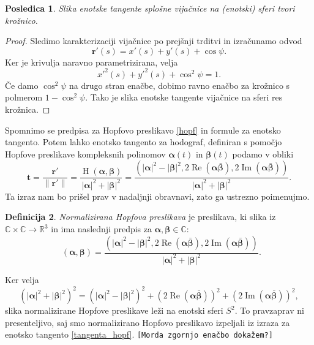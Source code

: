 \documentclass[12pt,a4paper,twoside]{article}
\theoremstyle{definition} %
\newtheorem{definicija}{Definicija}[section]
\theoremstyle{plain} %
\newtheorem{posledica}[definicija]{Posledica}
\numberwithin{equation}{section}  %
\newcommand{\R}{\mathbb R}
\renewcommand{\C}{\mathbb C}
\newcommand{\tV}{\mathbf{t}}
\newcommand{\rV}{\mathbf{r}}
\newcommand{\balpha}{\boldsymbol \alpha}
\newcommand{\bbeta}{\boldsymbol \beta}
\DeclareMathOperator{\hopf}{H}
\DeclareMathOperator{\ReC}{Re}
\DeclareMathOperator{\ImC}{Im}
\DeclareMathOperator{\nhopf}{\hat{H}}
\begin{document}
\begin{posledica}
	\label{vijacnica_slika_tangente}
	Slika enotske tangente splošne vijačnice na (enotski) sferi tvori krožnico.
\end{posledica}
\begin{proof}
	Sledimo karakterizaciji vijačnice po prejšnji trditvi in izračunamo odvod
	\begin{equation*}
		\rV'(s)=x'(s)+y'(s)+\cos\psi.
	\end{equation*}
	Ker je krivulja naravno parametrizirana, velja
	\begin{equation*}
		x'^2(s)+y'^2(s)+\cos^2\psi=1.
	\end{equation*}
	Če damo $\cos^2\psi$ na drugo stran enačbe, dobimo ravno enačbo za krožnico s polmerom $1-\cos^2\psi.$ Tako je slika enotske tangente vijačnice na sferi res krožnica.
\end{proof}

Spomnimo se predpisa za Hopfovo preslikavo \eqref{hopf} in formule za enotsko tangento. Potem lahko enotsko tangento za hodograf, definiran s pomočjo Hopfove preslikave kompleksnih polinomov $\balpha(t)$ in $\bbeta(t)$ podamo v obliki
\begin{equation}
	\label{tangenta_hopf}
	\tV=\frac{\rV'}{\lVert\rV'\rVert}=\frac{\hopf(\balpha,\bbeta)}{|\balpha|^2+|\bbeta|^2}=\frac{(|\balpha|^2-|\bbeta|^2,2\ReC(\balpha\bar{\bbeta}),2\ImC(\balpha\bar{\bbeta}))}{|\balpha|^2+|\bbeta|^2}.
\end{equation}
Ta izraz nam bo prišel prav v nadaljnji obravnavi, zato ga ustrezno poimenujmo.
\begin{definicija}
	\label{norm_hopf_def}
	\emph{Normalizirana Hopfova preslikava} je preslikava, ki slika iz $\C\times\C\to\R^3$ in ima naslednji predpis za $\balpha,\bbeta\in\C:$
	\begin{equation}
		\label{norm_hopf}
		\nhopf(\balpha,\bbeta)=\frac{(|\balpha|^2-|\bbeta|^2,2\ReC(\balpha\bar{\bbeta}),2\ImC(\balpha\bar{\bbeta}))}{|\balpha|^2+|\bbeta|^2}.
	\end{equation}
\end{definicija}
Ker velja 
\begin{equation}
	(|\balpha|^2+|\bbeta|^2)^2=(|\balpha|^2-|\bbeta|^2)^2+(2\ReC(\balpha\bar{\bbeta}))^2+(2\ImC(\balpha\bar{\bbeta}))^2,
\end{equation}
slika normalizirane Hopfove preslikave leži na enotski sferi $S^2.$ To pravzaprav ni presenteljivo, saj smo normalizirano Hopfovo preslikavo izpeljali iz izraza za enotsko tangento \eqref{tangenta_hopf}.
\texttt{[Morda zgornjo enačbo dokažem?]}
\end{document}
